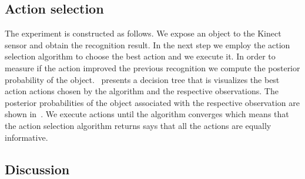     \subsection{Action selection}
        The experiment is constructed as follows. We expose an object to the Kinect sensor and obtain the recognition result. In the next step we employ the action selection algorithm to choose the best action and we execute it. In order to measure if the action improved the previous recognition we compute the posterior probability of the object.~ presents a decision tree that is visualizes the best action actions chosen by the algorithm and the respective observations. The posterior probabilities of the object associated with the respective observation are shown in~. We execute actions until the algorithm converges which means that the action selection algorithm returns says that all the actions are equally informative.

    \subsection{Discussion}
        

